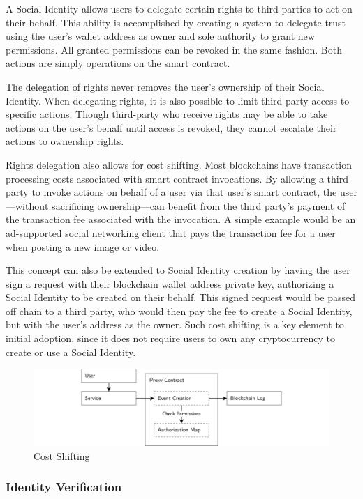 \documentclass[12pt,letterpaper]{article}
\begin{document}
A Social Identity allows users to delegate certain rights to third parties to act on their
behalf. This ability is accomplished by creating a system to delegate trust using the
user's wallet address as owner and sole authority to grant new permissions. All granted
permissions can be revoked in the same fashion. Both actions are simply operations on the
smart contract.

The delegation of rights never removes the user's ownership of their Social Identity. When
delegating rights, it is also possible to limit third-party access to specific actions.
Though third-party  who receive rights may be able to take actions on the
user's behalf until access is revoked, they cannot escalate their actions to ownership
rights.

Rights delegation also allows for cost shifting. Most blockchains have transaction
processing costs associated with smart contract invocations. By allowing a third party to
invoke actions on behalf of a user via that user's smart contract, the user---without
sacrificing ownership---can benefit from the third party's payment of the transaction fee
associated with the invocation. A simple example would be an ad-supported social
networking client that pays the transaction fee for a user when posting a new image or
video.

This concept can also be extended to Social Identity creation by having the user sign a
request with their blockchain wallet address private key, authorizing a Social Identity to
be created on their behalf. This signed request would be passed off chain to a third
party, who would then pay the fee to create a Social Identity, but with the user's address
as the owner. Such cost shifting is a key element to initial adoption, since it does not
require users to own any cryptocurrency to create or use a Social Identity.

\begin{figure}
	\includegraphics[width=\linewidth]{figures/Cost Shifting.png}
	\caption{Cost Shifting}
	\label{fig:2}
\end{figure}

\subsubsection{Identity Verification}
\end{document}
